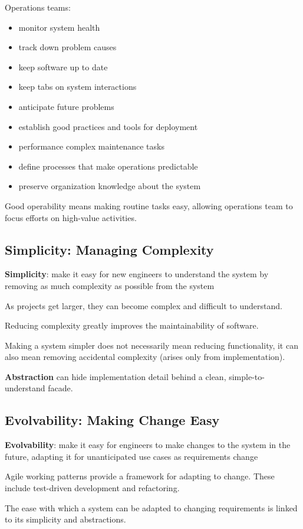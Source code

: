 \documentclass[11pt]{article}
\begin{document}
Operations teams:
\begin{itemize}
\item monitor system health
\item track down problem causes
\item keep software up to date
\item keep tabs on system interactions
\item anticipate future problems
\item establish good practices and tools for deployment
\item performance complex maintenance tasks
\item define processes that make operations predictable
\item preserve organization knowledge about the system
\end{itemize}

Good operability means making routine tasks easy, allowing
operations team to focus efforts on high-value activities.
\subsection{Simplicity: Managing Complexity}
\label{sec:org653b215}
\textbf{Simplicity}: make it easy for new engineers to understand the system by removing
as much complexity as possible from the system

As projects get larger, they can become complex and difficult to understand.

Reducing complexity greatly improves the maintainability of software.

Making a system simpler does not necessarily mean reducing functionality,
it can also mean removing accidental complexity (arises only from
implementation).

\textbf{Abstraction} can hide implementation detail behind a clean, simple-to-understand
facade.
\subsection{Evolvability: Making Change Easy}
\label{sec:orgf1fcfe0}
\textbf{Evolvability}: make it easy for engineers to make changes to the system in the
future, adapting it for unanticipated use cases as requirements change

Agile working patterns provide a framework for adapting to change.
These include test-driven development and refactoring.

The ease with which a system can be adapted to changing requirements is
linked to its simplicity and abstractions.
\end{document}
